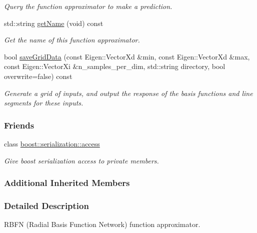 \begin{DoxyCompactItemize}
\begin{DoxyCompactList}\small\item\em Query the function approximator to make a prediction. \end{DoxyCompactList}\item 
std\+::string \hyperlink{classDmpBbo_1_1FunctionApproximatorRBFN_ad4c95407e44ba3e16b9651f9b81cd0e6}{get\+Name} (void) const 
\begin{DoxyCompactList}\small\item\em Get the name of this function approximator. \end{DoxyCompactList}\item 
bool \hyperlink{classDmpBbo_1_1FunctionApproximatorRBFN_a53d95f63de3b49491b1204f45a24ae25}{save\+Grid\+Data} (const Eigen\+::\+Vector\+Xd \&min, const Eigen\+::\+Vector\+Xd \&max, const Eigen\+::\+Vector\+Xi \&n\+\_\+samples\+\_\+per\+\_\+dim, std\+::string directory, bool overwrite=false) const 
\begin{DoxyCompactList}\small\item\em Generate a grid of inputs, and output the response of the basis functions and line segments for these inputs. \end{DoxyCompactList}\end{DoxyCompactItemize}
\subsubsection*{Friends}
\begin{DoxyCompactItemize}
\item 
class \hyperlink{classDmpBbo_1_1FunctionApproximatorRBFN_ac98d07dd8f7b70e16ccb9a01abf56b9c}{boost\+::serialization\+::access}
\begin{DoxyCompactList}\small\item\em Give boost serialization access to private members. \end{DoxyCompactList}\end{DoxyCompactItemize}
\subsubsection*{Additional Inherited Members}


\subsubsection{Detailed Description}
R\+B\+F\+N (Radial Basis Function Network) function approximator. 

